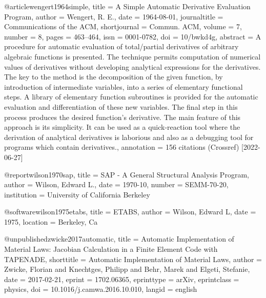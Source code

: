 @article{wengert1964simple,
  title = {A Simple Automatic Derivative Evaluation Program},
  author = {Wengert, R. E.},
  date = {1964-08-01},
  journaltitle = {Communications of the ACM},
  shortjournal = {Commun. ACM},
  volume = {7},
  number = {8},
  pages = {463--464},
  issn = {0001-0782},
  doi = {10/bwkd4g},
  abstract = {A procedure for automatic evaluation of total/partial derivatives of arbitrary algebraic functions is presented. The technique permits computation of numerical values of derivatives without developing analytical expressions for the derivatives. The key to the method is the decomposition of the given function, by introduction of intermediate variables, into a series of elementary functional steps. A library of elementary function subroutines is provided for the automatic evaluation and differentiation of these new variables. The final step in this process produces the desired function's derivative. The main feature of this approach is its simplicity. It can be used as a quick-reaction tool where the derivation of analytical derivatives is laborious and also as a debugging tool for programs which contain derivatives.},
  annotation = {156 citations (Crossref) [2022-06-27]}
}

@report{wilson1970sap,
  title = {{{SAP}} - {{A General Structural Analysis Program}}},
  author = {Wilson, Edward L.},
  date = {1970-10},
  number = {SEMM-70-20},
  institution = {University of California Berkeley}
}

@software{wilson1975etabs,
  title = {{{ETABS}}},
  author = {Wilson, Edward L},
  date = {1975},
  location = {Berkeley, Ca}
}

@unpublished{zwicke2017automatic,
  title = {Automatic Implementation of Material Laws: {{Jacobian}} Calculation in a Finite Element Code with {{TAPENADE}}},
  shorttitle = {Automatic Implementation of Material Laws},
  author = {Zwicke, Florian and Knechtges, Philipp and Behr, Marek and Elgeti, Stefanie},
  date = {2017-02-21},
  eprint = {1702.06365},
  eprinttype = {arXiv},
  eprintclass = {physics},
  doi = {10.1016/j.camwa.2016.10.010},
  langid = {english}
}

